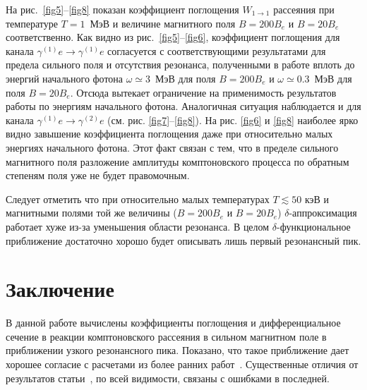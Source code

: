 \documentclass[cp1251%
               ]{jetp} %
\begin{document}
На рис.~\ref{fig5}--\ref{fig8} показан  коэффициент поглощения $W_{1\to1}$ рассеяния при температуре $T=1 $~МэВ и величине магнитного поля $B=200B_e$ и $B=20B_e$ соответственно. Как видно из рис.~\ref{fig5}--\ref{fig6}, коэффициент поглощения для канала $\gamma^{(1)}e\to\gamma^{(1)}e$ согласуется с соответствующими результатами для предела сильного поля и отсутствия резонанса, полученными в работе \cite{Chistyakov:2009} вплоть до энергий начального фотона  $\omega\simeq3$~МэВ для поля $B=200B_e$ и  $\omega\simeq0.3$~МэВ для поля $B=20B_e$. Отсюда вытекает ограничение на применимость результатов работы \cite{Chistyakov:2009} по энергиям начального фотона. Аналогичная ситуация наблюдается и для канала $\gamma^{(1)}e\to\gamma^{(2)}e$ (см. рис. \ref{fig7}--\ref{fig8}).  На рис. \ref{fig6} и \ref{fig8} наиболее ярко видно завышение коэффициента поглощения даже при относительно малых энергиях начального фотона. Этот факт связан с тем, что в пределе сильного магнитного поля разложение амплитуды комптоновского процесса по обратным степеням поля уже не будет правомочным.  

Следует отметить   что при относительно малых температурах $T\lesssim50$ кэВ и магнитными полями той же величины ($B = 200 B_e$ и $B = 20 B_e$) $\delta$-аппроксимация работает хуже из-за уменьшения области резонанса. В целом $\delta$-функциональное приближение достаточно хорошо будет описывать лишь первый резонансный пик.






\section{Заключение}

В данной работе вычислены коэффициенты поглощения и дифференциальное сечение в реакции комптоновского рассеяния в сильном магнитном поле в приближении узкого резонансного пика. Показано, что такое приближение дает хорошее согласие с расчетами из более ранних работ~\cite{Harding:1991,Mushtukov:2015,SchwarmD:2017}. Существенные отличия от результатов статьи~\cite{Mushtukov:2016}, по всей видимости, связаны с ошибками в последней. 





\end{document}
